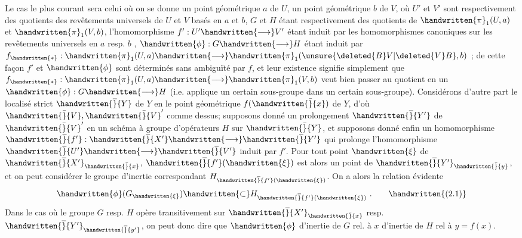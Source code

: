 Le cas le plus courant sera celui où on se donne un point géométrique $a$ de $U$,  un point géométrique $b$  de $V$, où $U'$ et $V'$ sont respectivement des quotients des revêtements universels de $U$ et $V$ basés en $a$ et $b$, $G$ et $H$ étant respectivement des quotients de $\handwritten{\pi}_{1}(U,a)$ et $\handwritten{\pi}_{1}(V,b)$, l'homomorphisme $f':U'\handwritten{\longrightarrow}V'$ étant induit par les homomorphismes canoniques sur les revêtements universels en $a$ resp. $b$  ,  $\handwritten{\phi}:G\handwritten{\longrightarrow}H$ étant induit par $f_{\handwritten{*}}:\handwritten{\pi}_{1}(U,a)\handwritten{\longrightarrow}\handwritten{\pi}_{1}(\unsure{\deleted{B}V|\deleted{V}B},b)$ ; de cette façon $f'$ et $\handwritten{\phi}$ sont déterminés sans ambiguïté par $f$, et leur existence signifie simplement que $f_{\handwritten{*}}:\handwritten{\pi}_{1}(U,a)\handwritten{\longrightarrow}\handwritten{\pi}_{1}(V,b)$ veut bien passer au quotient en un $\handwritten{\phi}:G\handwritten{\longrightarrow}H$ (i.e. applique un certain sous-groupe dans un certain sous-groupe). Considérons d'autre part le localisé strict $\handwritten{\overline}{Y}$ de $Y$ en le point géométrique $f(\handwritten{\bar}{x})$ de $Y$, d'où  $\handwritten{\bar}{V},\handwritten{\bar}{V}'$ comme dessus; supposons donné un prolongement $\handwritten{\overline}{Y'}$ de $\handwritten{\bar}{V}'$ en un schéma à groupe d'opérateurs $H$ sur $\handwritten{\bar}{Y}$, et supposons donné enfin un homomorphisme $\handwritten{\overline}{f'}:\handwritten{\overline}{X'}\handwritten{\longrightarrow}\handwritten{\overline}{Y'}$ qui prolonge l'homomorphisme  $\handwritten{\overline}{U'}\handwritten{\longrightarrow}\handwritten{\overline}{V'}$ induit par $f'$. Pour tout point $\handwritten{\xi}$ de $\handwritten{\overline}{X'}_{\handwritten{\bar}{x}}$, $\handwritten{\overline}{f'}(\handwritten{\xi})$ est alors un point de $\handwritten{\overline}{Y'}_{\handwritten{\bar}{y}}$, et on peut considérer le groupe d'inertie correspondant $H_{\handwritten{\overline}{f'}(\handwritten{\xi})}$. On a alors la relation évidente
\[
\handwritten{\phi}(G_{\handwritten{\xi}})\handwritten{\subset}H_{\handwritten{\overline}{f'}(\handwritten{\xi})}\ .
\tag*{\handwritten{(2.1)}}
\]
Dans le cas où le groupe $G$ resp. $H$ opère transitivement sur $\handwritten{\overline}{X'}_{\handwritten{\bar}{x}}$ resp. $\handwritten{\overline}{Y'}_{\handwritten{\overline}{y'}}$, on peut donc dire que $\handwritten{\phi}$   d'inertie de $G$ rel. à $x$   d'inertie de $H$ rel à $y=f(x)$.


